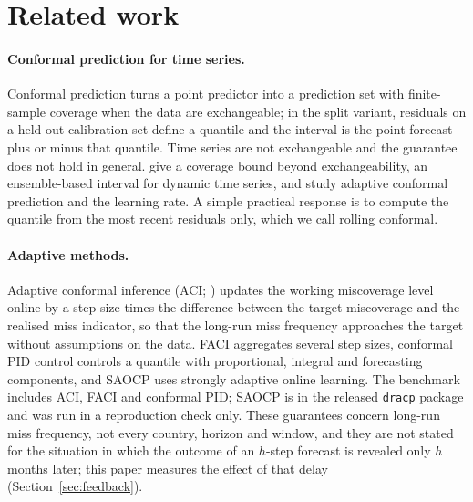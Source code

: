 \section{Related work}\label{sec:related}

\paragraph{Conformal prediction for time series.} Conformal prediction \citep{vovk2005algorithmic} turns a point predictor into a prediction set with finite-sample coverage when the data are exchangeable; in the split variant, residuals on a held-out calibration set define a quantile and the interval is the point forecast plus or minus that quantile. Time series are not exchangeable and the guarantee does not hold in general. \citet{barber2023beyond} give a coverage bound beyond exchangeability, \citet{xu2021enbpi} an ensemble-based interval for dynamic time series, and \citet{zaffran2022agaci} study adaptive conformal prediction and the learning rate. A simple practical response is to compute the quantile from the most recent residuals only, which we call rolling conformal.

\paragraph{Adaptive methods.} Adaptive conformal inference (ACI; \citealp{gibbs2021aci}) updates the working miscoverage level online by a step size times the difference between the target miscoverage and the realised miss indicator, so that the long-run miss frequency approaches the target without assumptions on the data. FACI \citep{gibbs2024faci} aggregates several step sizes, conformal PID control \citep{angelopoulos2023pid} controls a quantile with proportional, integral and forecasting components, and SAOCP \citep{bhatnagar2023saocp} uses strongly adaptive online learning. The benchmark includes ACI, FACI and conformal PID; SAOCP is in the released \texttt{dracp} package and was run in a reproduction check only. These guarantees concern long-run miss frequency, not every country, horizon and window, and they are not stated for the situation in which the outcome of an $h$-step forecast is revealed only $h$ months later; this paper measures the effect of that delay (Section~\ref{sec:feedback}).

